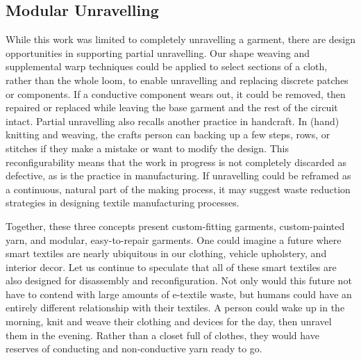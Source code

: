 
\subsection{Modular Unravelling}
While this work was limited to completely unravelling a garment, there are design opportunities in supporting partial unravelling. Our shape weaving and supplemental warp techniques could be applied to select sections of a cloth, rather than the whole loom, to enable unravelling and replacing discrete patches or components. If a conductive component wears out, it could be removed, then repaired or replaced while leaving the base garment and the rest of the circuit intact. %
Partial unravelling also recalls another practice in handcraft. In (hand) knitting and weaving, the crafts person can backing up a few steps, rows, or stitches if they make a mistake or want to modify the design. This reconfigurability means that the work in progress is not completely discarded as defective, as is the practice in manufacturing. If unravelling could be reframed as a continuous, natural part of the making process, it may suggest waste reduction strategies in designing textile manufacturing processes.

Together, these three concepts present custom-fitting garments, custom-painted yarn, and modular, easy-to-repair garments. One could imagine a future where smart textiles are nearly ubiquitous in our clothing, vehicle upholstery, and interior decor. Let us continue to speculate that all of these smart textiles are also designed for disassembly and reconfiguration. Not only would this future not have to contend with large amounts of e-textile waste, but humans could have an entirely different relationship with their textiles. A person could wake up in the morning, knit and weave their clothing and devices for the day, then unravel them in the evening. Rather than a closet full of clothes, they would have reserves of conducting and non-conductive yarn ready to go.

